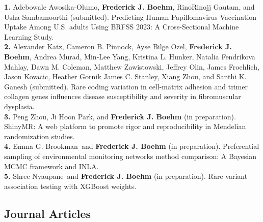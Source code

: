 \documentclass[
  10pt,
]
{article}
\begin{document}
\textbf{1.} \normalsize \normalsize Adebowale Awosika-Olumo\normalsize ,
\textbf{\normalsize Frederick J. Boehm}\normalsize ,
\normalsize RinoRinojj Gautam\normalsize , and \normalsize Usha
Sambamoorthi (submitted). Predicting Human Papillomavirus Vaccination
Uptake Among U.S. adults Using BRFSS 2023: A Cross-Sectional Machine
Learning Study.\\
\textbf{2.} \normalsize \normalsize Alexander Katz\normalsize ,
\normalsize Cameron B. Pinnock\normalsize , \normalsize Ayse Bilge
Ozel\normalsize , \textbf{\normalsize Frederick J. Boehm}\normalsize ,
\normalsize Andrea Murad\normalsize , \normalsize Min-Lee
Yang\normalsize , \normalsize Kristina L. Hunker\normalsize ,
\normalsize Natalia Fendrikova Mahlay\normalsize , \normalsize Dawn M.
Coleman\normalsize , \normalsize Matthew Zawistowski\normalsize ,
\normalsize Jeffrey Olin\normalsize , \normalsize James
Froehlich\normalsize , \normalsize Jason Kovacic\normalsize ,
\normalsize Heather Gornik James C. Stanley\normalsize ,
\normalsize Xiang Zhou\normalsize , and \normalsize Santhi K. Ganesh
(submitted). Rare coding variation in cell-matrix adhesion and trimer
collagen genes influences disease susceptibility and severity in
fibromuscular dysplasia.\\
\textbf{3.} \normalsize \normalsize Peng Zhou\normalsize ,
\normalsize Ji Hoon Park\normalsize , and
\textbf{\normalsize Frederick J. Boehm} (in preparation). ShinyMR: A web
platform to promote rigor and reproducibility in Mendelian randomization
studies.\\
\textbf{4.} \normalsize \normalsize Emma G. Brookman\normalsize ~and
\textbf{\normalsize Frederick J. Boehm} (in preparation). Preferential
sampling of environmental monitoring networks method comparison: A
Bayesian MCMC framework and INLA.\\
\textbf{5.} \normalsize \normalsize Shree Nyaupane\normalsize ~and
\textbf{\normalsize Frederick J. Boehm} (in preparation). Rare variant
association testing with XGBoost weights.

\subsection{Journal Articles}\label{journal-articles}
\end{document}
